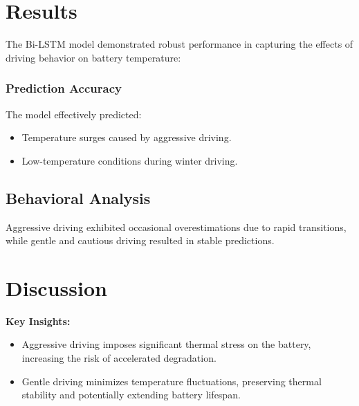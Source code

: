 \section{Results}
The \gls{Bi-LSTM} model demonstrated robust performance in capturing the effects of driving behavior on battery temperature:

\subsubsection{Prediction Accuracy}
The model effectively predicted:
\begin{itemize}
    \item Temperature surges caused by aggressive driving.
    \item Low-temperature conditions during winter driving.
\end{itemize}

\subsection{Behavioral Analysis}

Aggressive driving exhibited occasional overestimations due to rapid transitions, while gentle and cautious driving resulted in stable predictions.



\section{Discussion}
\textbf{Key Insights:}
\begin{itemize}
    \item Aggressive driving imposes significant thermal stress on the battery, increasing the risk of accelerated degradation.
    \item Gentle driving minimizes temperature fluctuations, preserving thermal stability and potentially extending battery lifespan.
\end{itemize}

